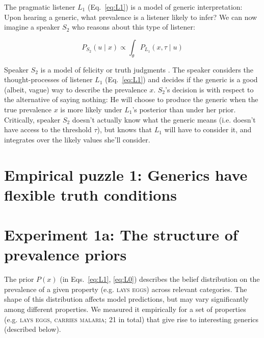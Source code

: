 \documentclass[10pt,letterpaper]{article}
\begin{document}
The pragmatic listener $L_1$ (Eq.~\ref{eq:L1}) is a model of generic interpretation: Upon hearing a generic, what prevalence is a listener likely to infer?
We can now imagine a speaker $S_2$ who reasons about this type of listener: 

\begin{equation} 
P_{S_{2}}(u \mid x) \propto  \int_{\theta} P_{L_{1}}(x , \tau \mid u) %
\label{eq:S2}
\end{equation}

Speaker $S_2$ is a model of felicity or truth judgments \cite{Degen2014}.
The speaker considers the thought-processes of listener $L_1$ (Eq.~\ref{eq:L1}) and decides if the generic is a good (albeit, vague) way to describe the prevalence $x$. 
$S_2$'s decision is with respect to the alternative of saying nothing: He will choose to produce the generic when the true prevalence $x$ is more likely under $L_1$'s posterior than under her prior. 
Critically, speaker $S_{2}$ doesn't actually know what the generic means (i.e. doesn't have access to the threshold $\tau$), but knows that $L_{1}$ will have to consider it, and integrates over the likely values she'll consider.



\section*{Empirical puzzle 1: Generics have flexible truth conditions}

\section*{Experiment 1a: The structure of prevalence priors}



 The prior $P(x)$ (in Eqs.~\ref{eq:L1}, \ref{eq:L0}) describes the belief distribution on the prevalence of a given property (e.g. \textsc{lays eggs}) across relevant categories. 
The shape of this distribution affects model predictions, but may vary significantly among different properties.
 We measured it empirically for a set of properties (e.g. \textsc{lays eggs, carries malaria}; 21 in total) that give rise to interesting generics (described below). 
 
\end{document}
